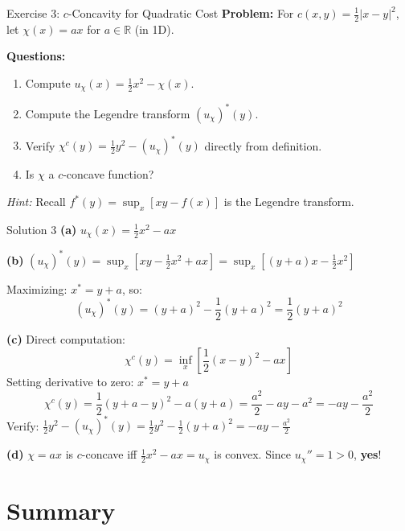 \documentclass[aspectratio=169]{beamer}
\newcommand{\R}{\mathbb{R}}
\begin{document}
\begin{frame}{Exercise 3: $c$-Concavity for Quadratic Cost}
\textbf{Problem:} For $c(x,y) = \frac{1}{2}|x-y|^2$, let $\chi(x) = ax$ for $a \in \R$ (in 1D).

\vspace{0.3cm}
\textbf{Questions:}
\begin{enumerate}
    \item[(a)] Compute $u_\chi(x) = \frac{1}{2}x^2 - \chi(x)$.
    \item[(b)] Compute the Legendre transform $(u_\chi)^*(y)$.
    \item[(c)] Verify $\chi^c(y) = \frac{1}{2}y^2 - (u_\chi)^*(y)$ directly from definition.
    \item[(d)] Is $\chi$ a $c$-concave function?
\end{enumerate}

\vspace{0.5cm}
\textit{Hint:} Recall $f^*(y) = \sup_x [xy - f(x)]$ is the Legendre transform.
\end{frame}

\begin{frame}{Solution 3}
\textbf{(a)} $u_\chi(x) = \frac{1}{2}x^2 - ax$

\vspace{0.2cm}
\textbf{(b)} $(u_\chi)^*(y) = \sup_x \left[xy - \frac{1}{2}x^2 + ax\right] = \sup_x \left[(y+a)x - \frac{1}{2}x^2\right]$

Maximizing: $x^* = y + a$, so:
\[
(u_\chi)^*(y) = (y+a)^2 - \frac{1}{2}(y+a)^2 = \frac{1}{2}(y+a)^2
\]

\vspace{0.2cm}
\textbf{(c)} Direct computation:
\[
\chi^c(y) = \inf_x \left[\frac{1}{2}(x-y)^2 - ax\right]
\]
Setting derivative to zero: $x^* = y + a$
\[
\chi^c(y) = \frac{1}{2}(y+a-y)^2 - a(y+a) = \frac{a^2}{2} - ay - a^2 = -ay - \frac{a^2}{2}
\]
Verify: $\frac{1}{2}y^2 - (u_\chi)^*(y) = \frac{1}{2}y^2 - \frac{1}{2}(y+a)^2 = -ay - \frac{a^2}{2}$ \checkmark

\vspace{0.2cm}
\textbf{(d)} $\chi = ax$ is $c$-concave iff $\frac{1}{2}x^2 - ax = u_\chi$ is convex. Since $u_\chi'' = 1 > 0$, \textbf{yes}!
\end{frame}

\section{Summary}
\end{document}
